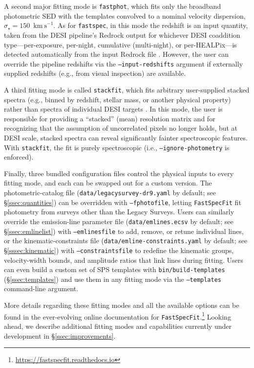 \documentclass[modern,linenumbers]{aastex701}
\newcommand{\fastspecfit}{\texttt{FastSpecFit}}
\newcommand{\fastspec}{\texttt{fastspec}}
\newcommand{\fastphot}{\texttt{fastphot}}
\newcommand{\kms}{\ensuremath{\mathrm{km~s}^{-1}}}
\newcommand{\vdisp}{\ensuremath{\sigma_\star}}
\begin{document}
A second major fitting mode is \fastphot, which fits only the
broadband photometric SED with the templates convolved to a nominal
velocity dispersion, $\vdisp = 150$~\kms. As for \fastspec, in this
mode the redshift is an input quantity, taken from the DESI pipeline's
Redrock output for whichever DESI coaddition type---per-exposure,
per-night, cumulative (multi-night), or per-HEALPix---is detected
automatically from the input Redrock file \citep{guy23a,
  desi-collaboration26a}. However, the user can override the pipeline
redshifts via the \texttt{--input-redshifts} argument if externally
supplied redshifts (e.g., from visual inspection) are available.

A third fitting mode is called \texttt{stackfit}, which fits arbitrary
user-supplied stacked spectra (e.g., binned by redshift, stellar mass,
or another physical property) rather than spectra of individual DESI
targets \citep[e.g.,][]{scholte24a}. In this mode, the user is
responsible for providing a ``stacked'' (mean) resolution matrix and
for recognizing that the assumption of uncorrelated pixels no longer
holds, but at DESI scale, stacked spectra can reveal significantly
fainter spectroscopic features. With \texttt{stackfit}, the fit is
purely spectroscopic (i.e., \texttt{--ignore-photometry} is enforced).

Finally, three bundled configuration files control the physical inputs
to every fitting mode, and each can be swapped out for a custom
version. The photometric-catalog file
(\texttt{data/legacysurvey-dr9.yaml} by default; see
\S\ref{ssec:quantities}) can be overridden with \texttt{--fphotofile},
letting \fastspecfit{} fit photometry from surveys other than the
Legacy Surveys. Users can similarly override the emission-line
parameter file (\texttt{data/emlines.ecsv} by default; see
\S\ref{ssec:emlinelist}) with \texttt{--emlinesfile} to add, remove,
or retune individual lines, or the kinematic-constraints file
(\texttt{data/emline-constraints.yaml} by default; see
\S\ref{sssec:kinematic}) with \texttt{--constraintsfile} to redefine
the kinematic groups, velocity-width bounds, and amplitude ratios that
link lines during fitting. Users can even build a custom set of SPS
templates with \texttt{bin/build-templates} (\S\ref{ssec:templates})
and use them in any fitting mode via the \texttt{--templates}
command-line argument.

More details regarding these fitting modes and all the available
options can be found in the ever-evolving online documentation for
\fastspecfit.\footnote{\url{https://fastspecfit.readthedocs.io}}
Looking ahead, we describe additional fitting modes and capabilities
currently under development in \S\ref{ssec:improvements}.
\end{document}
